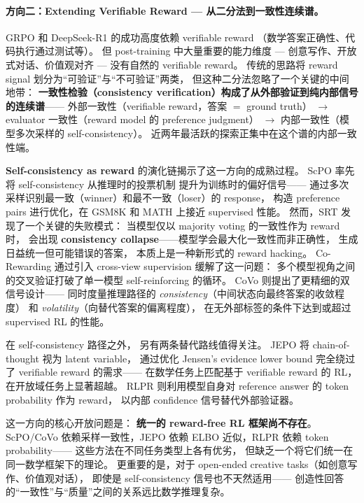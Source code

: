 \paragraph{方向二：Extending Verifiable Reward --- 从二分法到一致性连续谱。}
GRPO 和 DeepSeek-R1 的成功高度依赖 verifiable reward
（数学答案正确性、代码执行通过测试等）。
但 post-training 中大量重要的能力维度 ---
创意写作、开放式对话、价值观对齐 ---
没有自然的 verifiable reward。
传统的思路将 reward signal 划分为``可验证''与``不可验证''两类，
但这种二分法忽略了一个关键的中间地带：
\textbf{一致性检验（consistency verification）构成了从外部验证到纯内部信号的连续谱}——
外部一致性（verifiable reward，答案 $=$ ground truth）
$\rightarrow$ evaluator 一致性（reward model 的 preference judgment）
$\rightarrow$ 内部一致性（模型多次采样的 self-consistency）。
近两年最活跃的探索正集中在这个谱的内部一致性端。

\textbf{Self-consistency as reward} 的演化链揭示了这一方向的成熟过程。
ScPO \cite{prasad2024scpo} 率先将 self-consistency 从推理时的投票机制
提升为训练时的偏好信号——
通过多次采样识别最一致（winner）和最不一致（loser）的 response，
构造 preference pairs 进行优化，在 GSM8K 和 MATH 上接近 supervised 性能。
然而，SRT \cite{sheikh2025srt} 发现了一个关键的失败模式：
当模型仅以 majority voting 的一致性作为 reward 时，
会出现 \textbf{consistency collapse}——模型学会最大化一致性而非正确性，
生成日益统一但可能错误的答案，
本质上是一种新形式的 reward hacking。
Co-Rewarding \cite{corewarding2025} 通过引入 cross-view supervision 缓解了这一问题：
多个模型视角之间的交叉验证打破了单一模型 self-reinforcing 的循环。
CoVo \cite{zhang2025covo} 则提出了更精细的双信号设计——
同时度量推理路径的 \textit{consistency}（中间状态向最终答案的收敛程度）
和 \textit{volatility}（向替代答案的偏离程度），
在无外部标签的条件下达到或超过 supervised RL 的性能。

\noindent
在 self-consistency 路径之外，
另有两条替代路线值得关注。
JEPO \cite{jepo2025} 将 chain-of-thought 视为 latent variable，
通过优化 Jensen's evidence lower bound 完全绕过了 verifiable reward 的需求——
在数学任务上匹配基于 verifiable reward 的 RL，在开放域任务上显著超越。
RLPR \cite{yu2025rlpr} 则利用模型自身对 reference answer 的 token probability 作为 reward，
以内部 confidence 信号替代外部验证器。

\noindent
这一方向的核心开放问题是：
\textbf{统一的 reward-free RL 框架尚不存在}。
ScPO/CoVo 依赖采样一致性，JEPO 依赖 ELBO 近似，RLPR 依赖 token probability——
这些方法在不同任务类型上各有优劣，
但缺乏一个将它们统一在同一数学框架下的理论。
更重要的是，对于 open-ended creative tasks（如创意写作、价值观对话），
即使是 self-consistency 信号也不天然适用——
创造性回答的``一致性''与``质量''之间的关系远比数学推理复杂。


